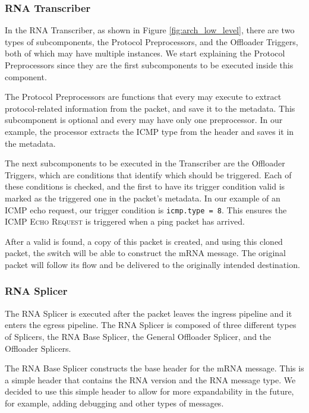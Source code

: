 \subsubsection*{RNA Transcriber}

In the RNA Transcriber, as shown in Figure \ref{fig:arch_low_level}, there are two types of subcomponents, the Protocol Preprocessors, and the Offloader Triggers, both of which may have multiple instances. We start explaining the Protocol Preprocessors since they are the first subcomponents to be executed inside this component.

The Protocol Preprocessors are functions that every \ProtocolTemplate{} may execute to extract protocol-related information from the packet, and save it to the metadata. This subcomponent is optional and every \ProtocolTemplate{} may have only one preprocessor. In our example, the processor extracts the ICMP type from the header and saves it in the metadata.

The next subcomponents to be executed in the Transcriber are the Offloader Triggers, which are conditions that identify which \Offloader{} should be triggered. Each of these conditions is checked, and the first \Offloader{} to have its trigger condition valid is marked as the triggered one in the packet's metadata. In our example of an ICMP echo request, our trigger condition is \texttt{icmp.type = 8}. This ensures the \Offloader{} \textsc{ICMP Echo Request} is triggered when a ping packet has arrived.


After a valid \Offloader{} is found, a copy of this packet is created, and using this cloned packet, the switch will be able to construct the mRNA message. The original packet will follow its flow and be delivered to the originally intended destination.

\subsubsection*{RNA Splicer}

The RNA Splicer is executed after the packet leaves the ingress pipeline and it enters the egress pipeline\footnotemark{}. The RNA Splicer is composed of three different types of Splicers, the RNA Base Splicer, the General Offloader Splicer, and the Offloader Splicers.

The RNA Base Splicer constructs the base header for the mRNA message. This is a simple header that contains the RNA version and the RNA message type. We decided to use this simple header to allow for more expandability in the future, for example, adding debugging and other types of messages.

